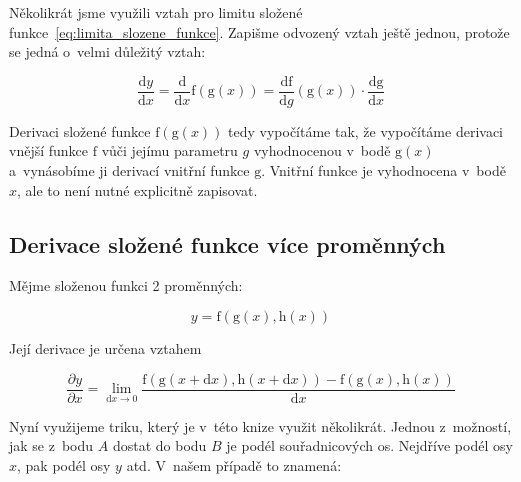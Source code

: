 Několikrát jsme využili vztah pro limitu složené funkce~\eqref{eq:limita_slozene_funkce}. Zapišme odvozený vztah ještě jednou, protože se jedná o~velmi důležitý vztah:

\begin{equation}
\frac{\mathrm{d}y}{\mathrm{d}x} = \frac{\mathrm{d}}{\mathrm{d}x}\mathrm{f}(\mathrm{g}(x)) = \frac{\mathrm{df}}{\mathrm{d}g}(\mathrm{g}(x)) \cdot \frac{\mathrm{dg}}{\mathrm{d}x}
\end{equation}

Derivaci složené funkce \(\mathrm{f}(\mathrm{g}(x))\) tedy vypočítáme tak, že vypočítáme derivaci vnější funkce \(\mathrm{f}\) vůči jejímu parametru \(g\) vyhodnocenou v~bodě \(\mathrm{g}(x)\) a~vynásobíme ji derivací vnitřní funkce \(\mathrm{g}\). Vnitřní funkce je vyhodnocena v~bodě \(x\), ale to není nutné explicitně zapisovat.

\subsection{Derivace složené funkce více proměnných}

Mějme složenou funkci 2 proměnných:

\begin{equation}
y = \mathrm{f}(\mathrm{g}(x), \mathrm{h}(x))
\end{equation}

Její derivace je určena vztahem

\begin{equation}
\frac{\partial y}{\partial x} = \lim_{\mathrm{d}x \to 0} \frac{\mathrm{f}(\mathrm{g}(x + \mathrm{d}x), \mathrm{h}(x + \mathrm{d}x)) - \mathrm{f}(\mathrm{g}(x), \mathrm{h}(x))}{\mathrm{d}x}
\end{equation}

Nyní využijeme triku, který je v~této knize využit několikrát. Jednou z~možností, jak se z~bodu \(A\) dostat do bodu \(B\) je podél souřadnicových os. Nejdříve podél osy \(x\), pak podél osy \(y\) atd. V~našem případě to znamená:


